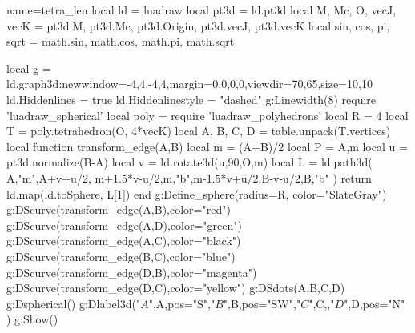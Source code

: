\documentclass[border=2pt]{standalone}
\begin{document}
\begin{luadraw}{name=tetra_len}
local ld = luadraw
local pt3d = ld.pt3d
local M, Mc, O, vecJ, vecK = pt3d.M, pt3d.Mc, pt3d.Origin,  pt3d.vecJ, pt3d.vecK
local sin, cos, pi, sqrt = math.sin, math.cos, math.pi, math.sqrt

local g = ld.graph3d:new{window={-4,4,-4,4},margin={0,0,0,0},viewdir={70,65},size={10,10}}
ld.Hiddenlines = true
ld.Hiddenlinestyle = "dashed"
g:Linewidth(8)
require 'luadraw_spherical'
local poly = require 'luadraw_polyhedrons'
local R = 4
local T = poly.tetrahedron(O, 4*vecK)
local A, B, C, D = table.unpack(T.vertices)
local function transform_edge(A,B)
    local m = (A+B)/2
    local  P = {A,m}
    local u = pt3d.normalize(B-A)
    local v = ld.rotate3d(u,90,{O,m})
    local L = ld.path3d( {A,"m",A+v+u/2, m+1.5*v-u/2,m,"b",m-1.5*v+u/2,B-v-u/2,B,"b"} )
    return ld.map(ld.toSphere, L[1])
end
g:Define_sphere({radius=R, color="SlateGray"})
g:DScurve(transform_edge(A,B),{color="red"})
g:DScurve(transform_edge(A,D),{color="green"})
g:DScurve(transform_edge(A,C),{color="black"})
g:DScurve(transform_edge(B,C),{color="blue"})
g:DScurve(transform_edge(D,B),{color="magenta"})
g:DScurve(transform_edge(D,C),{color="yellow"})
g:DSdots({A,B,C,D})
g:Dspherical()
g:Dlabel3d("$A$",A,{pos="S"},"$B$",B,{pos="SW"},"$C$",C,{},"$D$",D,{pos="N"} )
g:Show()
\end{luadraw}
\end{document}
